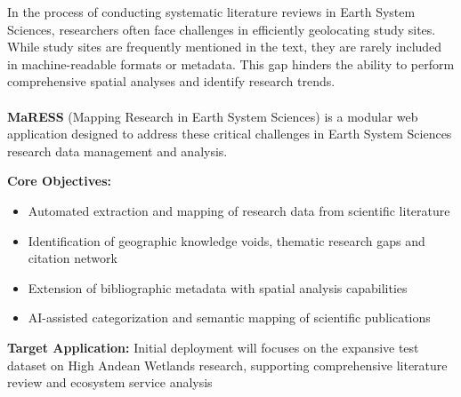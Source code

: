 \documentclass[a0,portrait]{a0poster}
\begin{document}
\begin{multicols}{3}

	\begin{tcolorbox}[mainbox, title={\Large\textbf{Project Overview}}]
		\vspace{0.5cm}
		In the process of conducting systematic literature reviews in Earth System Sciences, researchers often face challenges
		in efficiently geolocating study sites. While study sites are frequently mentioned in the text, they are rarely included
		in machine-readable formats or metadata. This gap hinders the ability to perform comprehensive spatial analyses and
		identify research trends.\\
		\\
		\textbf{MaRESS} (Mapping Research in Earth System Sciences) is a modular web application designed to address these critical challenges in Earth System Sciences research data management and analysis.

		\vspace{0.3cm}
		\textbf{Core Objectives:}
		\begin{itemize}[leftmargin=*]
			\item Automated extraction and mapping of research data from scientific literature
			\item Identification of geographic knowledge voids, thematic research gaps and citation network
			\item Extension of bibliographic metadata with spatial analysis capabilities
			\item AI-assisted categorization and semantic mapping of scientific publications
		\end{itemize}

		\vspace{0.3cm}
		\textbf{Target Application:} Initial deployment will focuses on the expansive test dataset on High Andean Wetlands
		research, supporting comprehensive literature review and ecosystem service analysis
		\vspace{0.5cm}
	\end{tcolorbox}

	\vspace{0.5cm}


\end{multicols}
\end{document}
